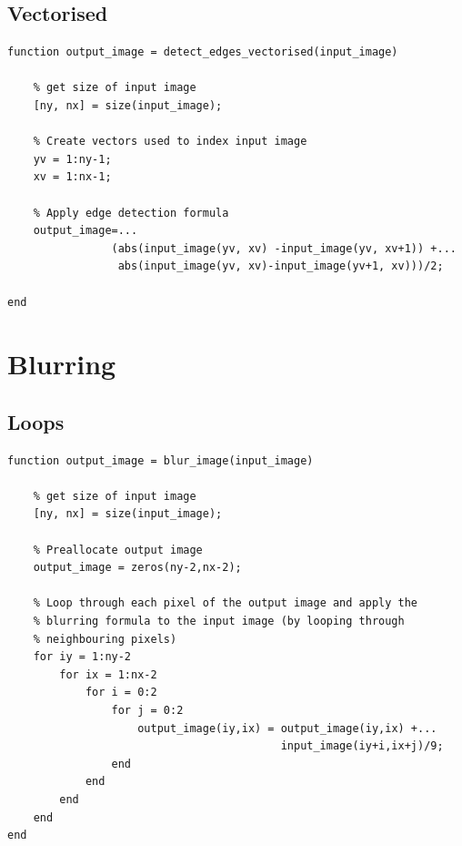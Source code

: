 \subsection{Vectorised}
\begin{minipage}{\textwidth}
\begin{lstlisting}
function output_image = detect_edges_vectorised(input_image) 

    % get size of input image
    [ny, nx] = size(input_image); 

    % Create vectors used to index input image
    yv = 1:ny-1; 
    xv = 1:nx-1; 

    % Apply edge detection formula
    output_image=...
    			(abs(input_image(yv, xv) -input_image(yv, xv+1)) +... 
                 abs(input_image(yv, xv)-input_image(yv+1, xv)))/2; 

end
\end{lstlisting}
\end{minipage}
\newpage
\section{Blurring}
\subsection{Loops}
\begin{minipage}{\textwidth}
\begin{lstlisting}
function output_image = blur_image(input_image)

    % get size of input image
    [ny, nx] = size(input_image);
    
    % Preallocate output image
    output_image = zeros(ny-2,nx-2);
    
    % Loop through each pixel of the output image and apply the 
    % blurring formula to the input image (by looping through 
    % neighbouring pixels)
    for iy = 1:ny-2
        for ix = 1:nx-2
            for i = 0:2
                for j = 0:2
                    output_image(iy,ix) = output_image(iy,ix) +... 
                                          input_image(iy+i,ix+j)/9;
                end
            end
        end
    end
end
\end{lstlisting}
\end{minipage}

